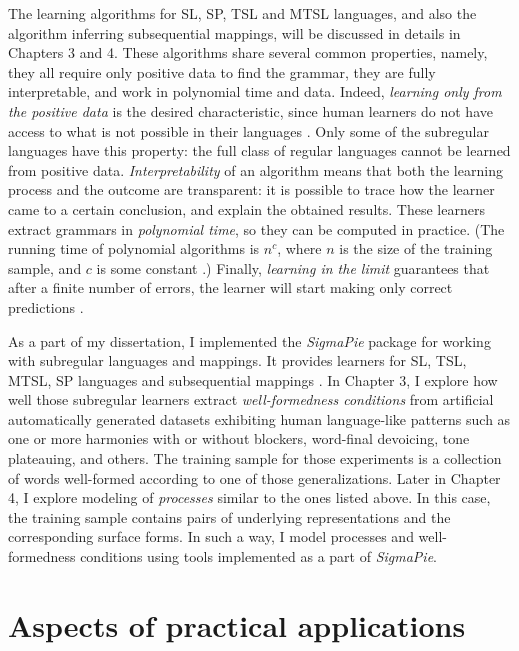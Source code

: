 The learning algorithms for SL, SP, TSL and MTSL languages, and also the algorithm inferring subsequential mappings, will be discussed in details in Chapters 3 and 4.
These algorithms share several common properties, namely, they all require only positive data to find the grammar, they are fully interpretable, and work in polynomial time and data.
Indeed, \emph{learning only from the positive data} is the desired characteristic, since human learners do not have access to what is not possible in their languages \citep{Chomsky1986}.
Only some of the subregular languages have this property: the full class of regular languages cannot be learned from positive data.
\emph{Interpretability} of an algorithm means that both the learning process and the outcome are transparent: it is possible to trace how the learner came to a certain conclusion, and explain the obtained results.
These learners extract grammars in \emph{polynomial time}, so they can be computed in practice.
(The running time of polynomial algorithms is $n^c$, where $n$ is the size of the training sample, and $c$ is some constant \citep{Sipser2013}.)
Finally, \emph{learning in the limit} guarantees that after a finite number of errors, the learner will start making only correct predictions \citep{Gold1967}. 

As a part of my dissertation, I implemented the \emph{SigmaPie} package \href{https://pypi.org/project/SigmaPie/}{\faCube} for working with subregular languages and mappings.
It provides learners for SL, TSL, MTSL, SP languages and subsequential mappings \citep{sigmapie}.
In Chapter 3, I explore how well those subregular learners extract \emph{well-formedness conditions} from artificial automatically generated datasets exhibiting human language-like patterns such as one or more harmonies with or without blockers, word-final devoicing, tone plateauing, and others.
The training sample for those experiments is a collection of words well-formed according to one of those generalizations.
Later in Chapter 4, I explore modeling of \emph{processes} similar to the ones listed above.
In this case, the training sample contains pairs of underlying representations and the corresponding surface forms.
In such a way, I model processes and well-formedness conditions using tools implemented as a part of \emph{SigmaPie}.


\section{Aspects of practical applications}
\label{aspects}


